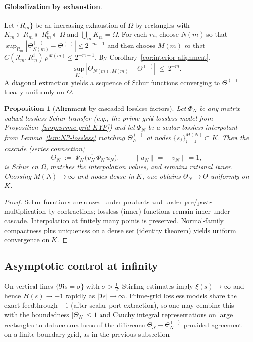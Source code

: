 \documentclass[11pt]{article}
\newtheorem{proposition}[theorem]{Proposition}
\theoremstyle{definition}
\theoremstyle{remark}
\DeclareMathOperator{\dettwo}{det_2}
\begin{document}
\paragraph{Globalization by exhaustion.}
Let \(\{R_m\}\) be an increasing exhaustion of \(\Omega\) by rectangles with \(K_m\Subset R_m\Subset R_m^\sharp\Subset\Omega\) and \(\bigcup_m K_m=\Omega\). For each \(m\), choose \(N(m)\) so that \(\sup_{R_m}|\Theta_{N(m)}^{(\dettwo)}-\Theta^{(\dettwo)}|\le 2^{-m-1}\) and then choose \(M(m)\) so that \(C(R_m,R_m^\sharp)\,\rho^{M(m)}\le 2^{-m-1}\). By Corollary~\ref{cor:interior-alignment},
\[
 \sup_{K_m}|\Theta_{N(m),M(m)}-\Theta^{(\dettwo)}|\ \le\ 2^{-m}.
\]
A diagonal extraction yields a sequence of Schur functions converging to \(\Theta^{(\dettwo)}\) locally uniformly on \(\Omega\).
\begin{proposition}[Alignment by cascaded lossless factors]\label{prop:cascade}
Let \(\Phi_N\) be any matrix-valued lossless Schur transfer (e.g., the prime-grid lossless model from Proposition~\ref{prop:prime-grid-KYP}) and let \(\Psi_N\) be a scalar lossless interpolant from Lemma~\ref{lem:NP-lossless} matching \(\Theta_N^{(\dettwo)}\) at nodes \(\{s_j\}_{j=1}^{M(N)}\subset K\). Then the cascade (series connection)
\[
 \Theta_N\;:=\;\Psi_N\,\big(v_N^*\,\Phi_N\,u_N\big),\qquad \|u_N\|=\|v_N\|=1,
\]
is Schur on \(\Omega\), matches the interpolation values, and remains rational inner. Choosing \(M(N)\to\infty\) and nodes dense in \(K\), one obtains \(\Theta_N\to \Theta\) uniformly on \(K\).
\end{proposition}
\begin{proof}
Schur functions are closed under products and under pre/post-multiplication by contractions; lossless (inner) functions remain inner under cascade. Interpolation at finitely many points is preserved. Normal-family compactness plus uniqueness on a dense set (identity theorem) yields uniform convergence on \(K\).
\end{proof}

\subsection{Asymptotic control at infinity}
On vertical lines \(\{\Re s=\sigma\}\) with \(\sigma>\tfrac12\), Stirling estimates imply \(\xi(s)\to\infty\) and hence \(H(s)\to -1\) rapidly as \(|\Im s|\to\infty\). Prime-grid lossless models share the exact feedthrough \(-1\) (after scalar port extraction), so one may combine this with the boundedness \(|\Theta_N|\le 1\) and Cauchy integral representations on large rectangles to deduce smallness of the difference \(\Theta_N-\Theta_N^{(\dettwo)}\) provided agreement on a finite boundary grid, as in the previous subsection.
\end{document}
